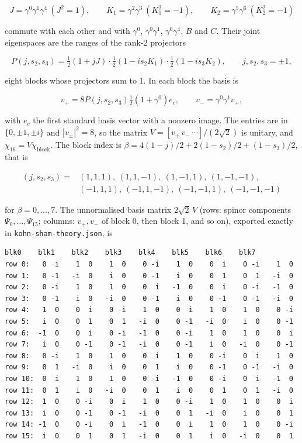 \documentclass[11pt]{article}
\begin{document}
\[
J=\gamma^0\gamma^1\gamma^4\ (J^2=1),\qquad K_1=\gamma^2\gamma^3\ (K_1^2=-1),\qquad K_2=\gamma^5\gamma^6\ (K_2^2=-1)
\]

commute with each other and with $\gamma^0$, $\gamma^0\gamma^1$, $\gamma^0\gamma^4$, $B$ and $C$. Their joint eigenspaces are the ranges of the rank-2 projectors

\[
P(j,s_2,s_3)=\tfrac12(1+jJ)\cdot\tfrac12(1-is_2K_1)\cdot\tfrac12(1-is_3K_2),\qquad j,s_2,s_3=\pm1,
\]

eight blocks whose projectors sum to 1. In each block the basis is

\[
v_+=8P(j,s_2,s_3)\tfrac12(1+\gamma^0)e_c,\qquad v_-=\gamma^0\gamma^1v_+ ,
\]

with $e_c$ the first standard basis vector with a nonzero image. The entries are in $\{0,\pm1,\pm i\}$ and $|v_\pm|^2=8$, so the matrix $V=[v_+\,v_-\,\cdots]/(2\sqrt2)$ is unitary, and $\chi_{16}=V\chi_{\mathrm{block}}$. The block index is $\beta=4(1-j)/2+2(1-s_2)/2+(1-s_3)/2$, that is

\[
\begin{aligned}
(j,s_2,s_3)={}&(1,1,1),\ (1,1,-1),\ (1,-1,1),\ (1,-1,-1),\\
&(-1,1,1),\ (-1,1,-1),\ (-1,-1,1),\ (-1,-1,-1)
\end{aligned}
\]

for $\beta=0,\dots,7$. The unnormalised basis matrix $2\sqrt2\,V$ (rows: spinor components $\Psi_0,\dots,\Psi_{15}$; columns: $v_+,v_-$ of block 0, then block 1, and so on), exported exactly in \texttt{kohn-sha\allowbreak{}m-theory\allowbreak{}.json}, is

\begin{Verbatim}[fontsize=\small]
        blk0    blk1    blk2    blk3    blk4    blk5    blk6    blk7
row 0:   0  i    1  0    1  0    0 -i    1  0    0  i    0 -i    1  0
row 1:   0 -1   -i  0    i  0    0 -1    i  0    0  1    0  1   -i  0
row 2:   0 -i    1  0    1  0    0  i   -1  0    0  i    0 -i   -1  0
row 3:   0 -1    i  0   -i  0    0 -1    i  0    0 -1    0 -1   -i  0
row 4:   1  0    0  i    0 -i    1  0    0  i    1  0    1  0    0 -i
row 5:   i  0    0  1    0  1   -i  0    0 -1   -i  0    i  0    0 -1
row 6:  -1  0    0  i    0 -i   -1  0    0 -i    1  0    1  0    0  i
row 7:   i  0    0 -1    0 -1   -i  0    0 -1    i  0   -i  0    0 -1
row 8:   0 -i    1  0    1  0    0  i    1  0    0 -i    0  i    1  0
row 9:   0  1   -i  0    i  0    0  1    i  0    0 -1    0 -1   -i  0
row 10:  0  i    1  0    1  0    0 -i   -1  0    0 -i    0  i   -1  0
row 11:  0  1    i  0   -i  0    0  1    i  0    0  1    0  1   -i  0
row 12:  1  0    0 -i    0  i    1  0    0 -i    1  0    1  0    0  i
row 13:  i  0    0 -1    0 -1   -i  0    0  1   -i  0    i  0    0  1
row 14: -1  0    0 -i    0  i   -1  0    0  i    1  0    1  0    0 -i
row 15:  i  0    0  1    0  1   -i  0    0  1    i  0   -i  0    0  1
\end{Verbatim}
\end{document}
